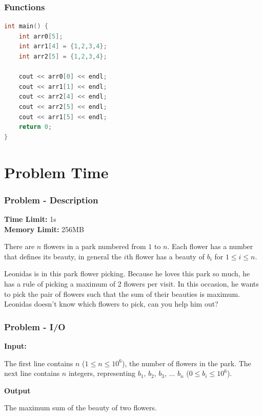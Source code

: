 \documentclass{beamer}
\begin{document}
\begin{frame}[fragile]
	\frametitle{Functions}

	\begin{lstlisting}[language=C++]
int main() { 
	int arr0[5];
	int arr1[4] = {1,2,3,4};
	int arr2[5] = {1,2,3,4};
 
	cout << arr0[0] << endl;
	cout << arr1[1] << endl;
	cout << arr2[4] << endl;
	cout << arr2[5] << endl;
	cout << arr1[5] << endl;
	return 0;  
}
	\end{lstlisting}
\end{frame}

\section{Problem Time}

\begin{frame}
	\frametitle{Problem - Description}

	\textbf{Time Limit:} 1s \\
	\textbf{Memory Limit:} 256MB

	There are $n$ flowers in a park numbered from $1$ to $n$. Each flower has a number that defines its beauty, in general the $i$th flower has a beauty of $b_i$ for $1 \leq i \leq n$. 
	
	Leonidas is in this park flower picking. Because he loves this park so much, he has a rule of picking a maximum of 2 flowers per visit. In this occasion, he wants to pick the pair of flowers such that the sum of their beauties is maximum. Leonidas doesn't know which flowers to pick, can you help him out?
\end{frame}

\begin{frame}
	\frametitle{Problem - I/O}

	\textbf{Input:}

	The first line contains $n$ ($1 \leq n \leq 10^6$), the number of flowers in the park. The next line contains $n$ integers, representing $b_1$, $b_2$, $b_3$, ... $b_n$  ($0 \leq b_i \leq 10^6$).

	\textbf{Output}

	The maximum sum of the beauty of two flowers.

\end{frame}
\end{document}
